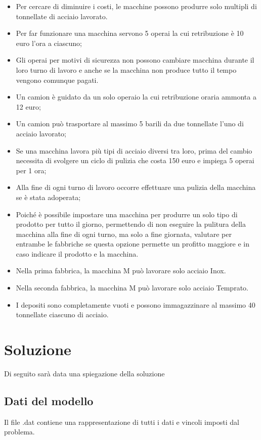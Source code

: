 \documentclass[12pt]{article} %
\begin{document}
\begin{itemize}
\item Per cercare di diminuire i costi, le macchine possono produrre solo multipli di tonnellate di acciaio lavorato.
\item Per far funzionare una macchina servono 5 operai la cui retribuzione è 10 euro l'ora a ciascuno;
\item Gli operai per motivi di sicurezza non possono cambiare macchina durante il loro turno di lavoro e anche se la macchina non produce tutto il tempo vengono comunque pagati.
\item Un camion è guidato da un solo operaio la cui retribuzione oraria ammonta a 12 euro;
\item Un camion può trasportare al massimo 5 barili da due tonnellate l'uno di acciaio lavorato;
\item Se una macchina lavora più tipi di acciaio diversi tra loro, prima del cambio necessita di svolgere un ciclo di pulizia che costa 150 euro e impiega 5 operai per 1 ora;
\item Alla fine di ogni turno di lavoro occorre effettuare una pulizia della macchina se è stata adoperata;
\item Poiché è possibile impostare una macchina per produrre un solo tipo di prodotto per tutto il giorno, permettendo di non eseguire la pulitura della macchina alla fine di ogni turno, ma solo a fine giornata, valutare per entrambe le fabbriche se questa opzione permette un profitto maggiore e in caso indicare il prodotto e la macchina.
\item Nella prima fabbrica, la macchina M può lavorare solo acciaio Inox.
\item Nella seconda fabbrica, la macchina M può lavorare solo acciaio Temprato.
\item I depositi sono completamente vuoti e possono immagazzinare al massimo 40 tonnellate ciascuno di acciaio.
\end{itemize}
\newpage



\section{Soluzione}
Di seguito sarà data una spiegazione della soluzione

\subsection{Dati del modello}
	Il file .dat contiene una rappresentazione di tutti i dati e vincoli imposti dal problema.
\end{document}
